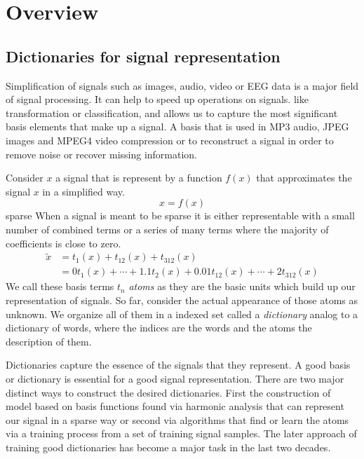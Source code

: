 \chapter{Overview}

\section{Dictionaries for signal representation}
\label{sec:dicts}
Simplification of signals such as images, audio, video or EEG data is a major
field of signal processing. It can help to speed up operations on signals. like
transformation or classification, and allows us to capture the most
significant basis elements that make up a signal. A basis that is
used in MP3 audio, JPEG images and MPEG4 video compression or to reconstruct
a signal in order to remove noise or recover missing information.

Consider $x$ a signal that is represent by a function $f(x)$ that approximates
the signal $x$ in a simplified way.
\begin{equation*}
x = f\left(x\right)
\end{equation*}
sparse 
When a signal is meant to be sparse it is either representable with a small
number of combined terms or a series of many terms where the majority of
coefficients is close to zero. 
\begin{equation*}
\begin{split}
\tilde{x} & = t_{1}(x) + t_{12}(x) + t_{312}(x)\\
& = 0t_{1}(x) + \cdots + 1.1t_{2}(x) + 0.01t_{12}(x) + \cdots +
2t_{312}(x)
\end{split}
\end{equation*}
We call these basis terms $t_n$ \emph{atoms} as they are the basic units
which build up our representation of signals. So far, consider the actual
appearance of those atoms as unknown. We organize all of them in a indexed set
called a \emph{dictionary} analog to a dictionary of words, where the indices
are the words and the atoms the description of them. 

Dictionaries capture the essence of the signals that they represent.
A good basis or dictionary is essential for a good signal representation.
There are two major distinct ways to construct the desired dictionaries. First
the construction of model based on basis functions found via harmonic analysis
that can represent our signal in a sparse way or second via algorithms that find
or learn the atoms via a training process from a set of training signal samples.
The later approach of training good dictionaries has become a major task in the
last two decades\cite{Mairal2010}.



